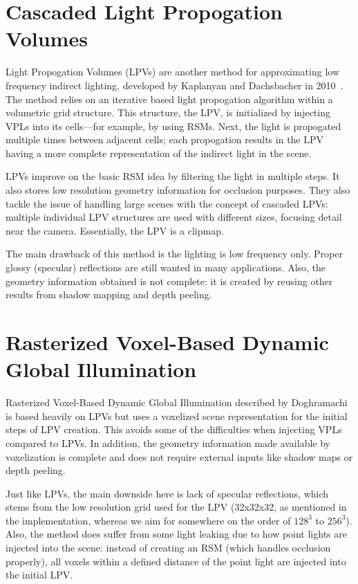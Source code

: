 \section{Cascaded Light Propogation Volumes}
Light Propogation Volumes (LPVs) are another method for approximating low frequency indirect lighting, developed by Kaplanyan and Dachsbacher in 2010~\cite{Kaplanyan:2010:CLP:1730804.1730821}. The method relies on an iterative based light propogation algorithm within a volumetric grid structure. This structure, the LPV, is initialized by injecting VPLs into its cells---for example, by using RSMs. Next, the light is propogated multiple times between adjacent cells; each propogation results in the LPV having a more complete representation of the indirect light in the scene.

LPVs improve on the basic RSM idea by filtering the light in multiple steps. It also stores low resolution geometry information for occlusion purposes. They also tackle the issue of handling large scenes with the concept of cascaded LPVs: multiple individual LPV structures are used with different sizes, focusing detail near the camera. Essentially, the LPV is a clipmap.

The main drawback of this method is the lighting is low frequency only. Proper glossy (specular) reflections are still wanted in many applications. Also, the geometry information obtained is not complete: it is created by reusing other results from shadow mapping and depth peeling.

\section{Rasterized Voxel-Based Dynamic Global Illumination}
Rasterized Voxel-Based Dynamic Global Illumination described by Doghramachi~\cite{doghramachi2013rasterized} is based heavily on LPVs but uses a voxelized scene representation for the initial steps of LPV creation. This avoids some of the difficulties when injecting VPLs compared to LPVs. In addition, the geometry information made available by voxelization is complete and does not require external inputs like shadow maps or depth peeling.

Just like LPVs, the main downside here is lack of specular reflections, which stems from the low resolution grid used for the LPV (32x32x32, as mentioned in the implementation, whereas we aim for somewhere on the order of $128^3$ to $256^3$). Also, the method does suffer from some light leaking due to how point lights are injected into the scene: instead of creating an RSM (which handles occlusion properly), all voxels within a defined distance of the point light are injected into the initial LPV.

